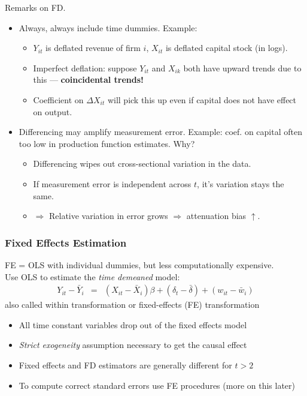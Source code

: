 \documentclass[notes=show,beamer,compress]{beamer}
\begin{document}
\begin{frame}{Remarks on FD.}
\begin{itemize}
\item{Always, always include time dummies. Example:
	\begin{itemize}
		\item{$Y_{it}$ is deflated revenue of firm $i$, $X_{it}$ is deflated capital stock (in logs).}
		\item{Imperfect deflation: suppose $Y_{it}$ and $X_{ik}$ both have upward trends due to this --- \textbf{coincidental trends!}}
		\item{Coefficient on $\Delta{X}_{it}$ will pick this up even if capital does not have effect on output.}
	\end{itemize}}
\item{Differencing may amplify measurement error. Example: coef. on capital often too low in production function estimates. Why?
\begin{itemize}
	\item{Differencing wipes out cross-sectional variation in the data.}
	\item{If measurement error is independent across $t$, it's variation stays the same.}
	\item{$\Rightarrow$ Relative variation in error grows $\Rightarrow$ attenuation bias $\uparrow$.}
\end{itemize}}
\end{itemize}
\end{frame}


\begin{frame}
\frametitle{Fixed Effects Estimation}
FE = OLS with individual dummies, but less computationally expensive.\\
Use OLS to estimate the \emph{time demeaned} model:
\begin{eqnarray*}
  Y_{it}-\bar{Y}_{i} &=& ( X_{it}-\bar{X}_{i}) \beta +( \delta_t-\bar{\delta}) +(w_{it}- \bar{w}_{i})
\end{eqnarray*}
also called within transformation or fixed-effects (FE) transformation

\begin{itemize}
\item All time constant variables drop out of the fixed effects  model
\item \emph{Strict exogeneity} assumption necessary to get the causal effect
\item Fixed effects and FD estimators are generally different for $t>2$
\item To compute correct standard errors use FE procedures (more on this later)
\end{itemize}
\end{frame}
\end{document}
